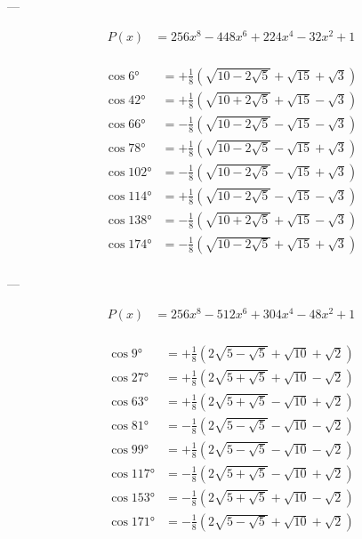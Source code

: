 ---

$$
\begin{aligned}
    P(x) &= 256 x^8-448 x^6+224 x^4-32 x^2+1\\
\end{aligned}
$$

$$
\begin{aligned}
    \cos 6°   &= +\frac{1}{8} \left(\sqrt{10-2\sqrt{5}}+\sqrt{15}+\sqrt{3}\right)\\
    \cos 42°  &= +\frac{1}{8} \left(\sqrt{10+2\sqrt{5}}+\sqrt{15}-\sqrt{3}\right)\\
    \cos 66°  &= -\frac{1}{8} \left(\sqrt{10-2\sqrt{5}}-\sqrt{15}-\sqrt{3}\right)\\
    \cos 78°  &= +\frac{1}{8} \left(\sqrt{10-2\sqrt{5}}-\sqrt{15}+\sqrt{3}\right)\\
    \cos 102° &= -\frac{1}{8} \left(\sqrt{10-2\sqrt{5}}-\sqrt{15}+\sqrt{3}\right)\\
    \cos 114° &= +\frac{1}{8} \left(\sqrt{10-2\sqrt{5}}-\sqrt{15}-\sqrt{3}\right)\\
    \cos 138° &= -\frac{1}{8} \left(\sqrt{10+2\sqrt{5}}+\sqrt{15}-\sqrt{3}\right)\\
    \cos 174° &= -\frac{1}{8} \left(\sqrt{10-2\sqrt{5}}+\sqrt{15}+\sqrt{3}\right)\\
\end{aligned}
$$

---

$$
\begin{aligned}
    P(x) &= 256 x^8-512 x^6+304 x^4-48 x^2+1\\
\end{aligned}
$$

$$
\begin{aligned}
    \cos 9°   &= +\frac{1}{8} \left(2\sqrt{5-\sqrt{5}}+\sqrt{10}+\sqrt{2}\right)\\
    \cos 27°  &= +\frac{1}{8} \left(2\sqrt{5+\sqrt{5}}+\sqrt{10}-\sqrt{2}\right)\\
    \cos 63°  &= +\frac{1}{8} \left(2\sqrt{5+\sqrt{5}}-\sqrt{10}+\sqrt{2}\right)\\
    \cos 81°  &= -\frac{1}{8} \left(2\sqrt{5-\sqrt{5}}-\sqrt{10}-\sqrt{2}\right)\\
    \cos 99°  &= +\frac{1}{8} \left(2\sqrt{5-\sqrt{5}}-\sqrt{10}-\sqrt{2}\right)\\
    \cos 117° &= -\frac{1}{8} \left(2\sqrt{5+\sqrt{5}}-\sqrt{10}+\sqrt{2}\right)\\
    \cos 153° &= -\frac{1}{8} \left(2\sqrt{5+\sqrt{5}}+\sqrt{10}-\sqrt{2}\right)\\
    \cos 171° &= -\frac{1}{8} \left(2\sqrt{5-\sqrt{5}}+\sqrt{10}+\sqrt{2}\right)\\
\end{aligned}
$$

